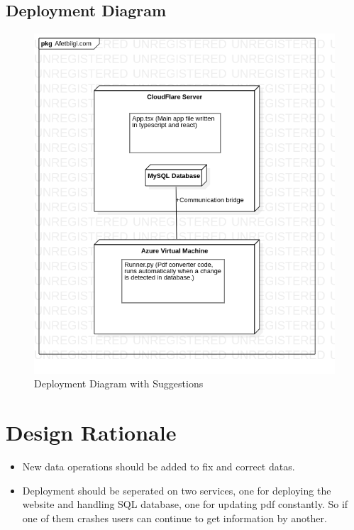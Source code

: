 \subsection{Deployment Diagram}
\begin{figure}[H]
    \includegraphics[scale = 0.5]{assets/DeploymentDiagram2.png}
    \caption[Deployment Diagram with Suggestions]{Deployment Diagram with Suggestions}
\end{figure}

\section{Design Rationale}
\begin{itemize}
    \item New data operations should be added to fix and correct datas.
    \item Deployment should be seperated on two services, one for deploying the website and handling SQL database, one for updating pdf constantly. So if one of them crashes users can continue to get information by another.
\end{itemize}